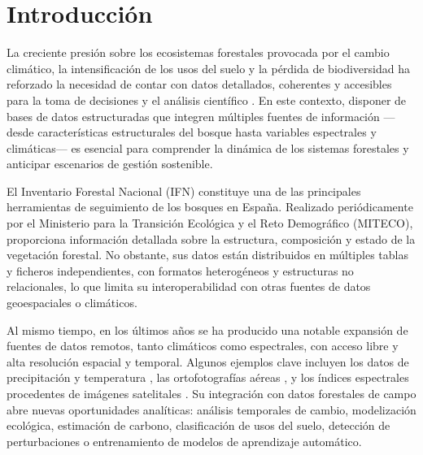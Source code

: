 \section{Introducción}


La creciente presión sobre los ecosistemas forestales provocada por el cambio climático, la intensificación de los usos del suelo y la pérdida de biodiversidad ha reforzado la necesidad de contar con datos detallados, coherentes y accesibles para la toma de decisiones y el análisis científico \cite{cmnucc1992, UNFCCC1997}. En este contexto, disponer de bases de datos estructuradas que integren múltiples fuentes de información —desde características estructurales del bosque hasta variables espectrales y climáticas— es esencial para comprender la dinámica de los sistemas forestales y anticipar escenarios de gestión sostenible.

\medskip

El Inventario Forestal Nacional (IFN) \cite{ifn} constituye una de las principales herramientas de seguimiento de los bosques en España. Realizado periódicamente por el Ministerio para la Transición Ecológica y el Reto Demográfico (MITECO), proporciona información detallada sobre la estructura, composición y estado de la vegetación forestal. No obstante, sus datos están distribuidos en múltiples tablas y ficheros independientes, con formatos heterogéneos y estructuras no relacionales, lo que limita su interoperabilidad con otras fuentes de datos geoespaciales o climáticos.

\medskip

Al mismo tiempo, en los últimos años se ha producido una notable expansión de fuentes de datos remotos, tanto climáticos como espectrales, con acceso libre y alta resolución espacial y temporal. Algunos ejemplos clave incluyen los datos de precipitación y temperatura \cite{copernicus_era5_land_daily}, las ortofotografías aéreas \cite{ign_pnoa}, y los índices espectrales procedentes de imágenes satelitales \cite{landsat5_data, landsat7_data, sentinel_hub_ndii, eos_indices_vegetacion}. Su integración con datos forestales de campo abre nuevas oportunidades analíticas: análisis temporales de cambio, modelización ecológica, estimación de carbono, clasificación de usos del suelo, detección de perturbaciones o entrenamiento de modelos de aprendizaje automático.

